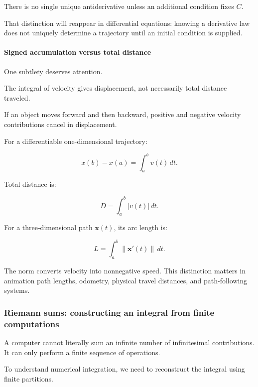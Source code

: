 There is no single unique antiderivative unless an additional condition fixes \(C\).

That distinction will reappear in differential equations: knowing a derivative law does not uniquely determine a trajectory until an initial condition is supplied.

\paragraph{Signed accumulation versus total distance}\label{02-foundations-ii-ch022-signed-accumulation-versus-total-distance}

\hypertarget{02-foundations-ii-ch022-signed-accumulation-versus-total-distance}{}

One subtlety deserves attention.

The integral of velocity gives displacement, not necessarily total distance traveled.

If an object moves forward and then backward, positive and negative velocity contributions cancel in displacement.

For a differentiable one-dimensional trajectory:

\[
x(b)-x(a)=\int_a^b v(t)\,dt.
\]

Total distance is:

\[
\boxed{D=\int_a^b|v(t)|\,dt}.
\]

For a three-dimensional path \(\mathbf x(t)\), its arc length is:

\[
\boxed{ L=\int_a^b\|\mathbf x'(t)\|\,dt }.
\]

The norm converts velocity into nonnegative speed. This distinction matters in animation path lengths, odometry, physical travel distances, and path-following systems.

\subsubsection{Riemann sums: constructing an integral from finite computations}\label{02-foundations-ii-ch022-riemann-sums-constructing-an-integral-from-finite-computations}

\hypertarget{02-foundations-ii-ch022-riemann-sums-constructing-an-integral-from-finite-computations}{}

A computer cannot literally sum an infinite number of infinitesimal contributions. It can only perform a finite sequence of operations.

To understand numerical integration, we need to reconstruct the integral using finite partitions.

